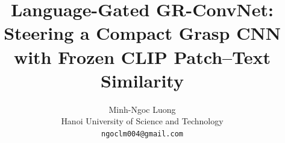 \documentclass[10pt,twocolumn,letterpaper]{article}
\title{Language-Gated GR-ConvNet: Steering a Compact Grasp CNN\\with Frozen CLIP Patch--Text Similarity}
\author{Minh-Ngoc Luong\\
Hanoi University of Science and Technology\\
{\tt\small ngoclm004@gmail.com}}
\begin{document}
\maketitle





\par
{
    \footnotesize
    
    
}

% 
\end{document}
